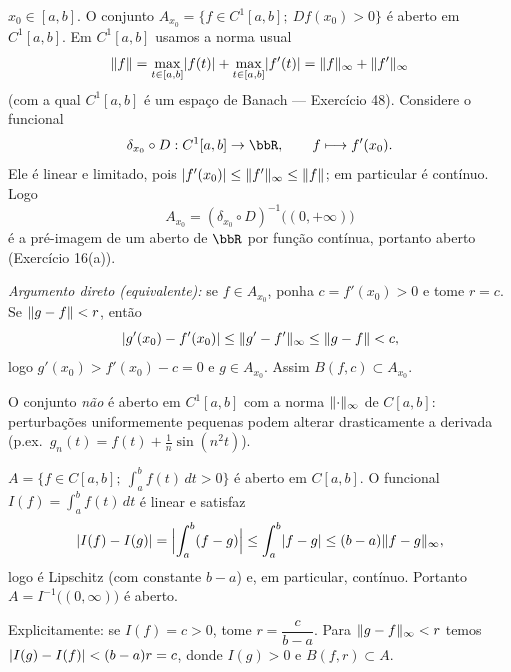 \begin{exercicio}{$x_0\in[a,b]$. O conjunto $A_{x_0}=\{f\in C^1[a,b];\ Df(x_0)>0\}$ é aberto em $C^1[a,b]$.}
\sol
Em $C^1[a,b]$ usamos a norma usual
\[ \lVert f\rVert=\max_{t\in[a,b]}\lvert f(t)\rvert+\max_{t\in[a,b]}\lvert f'(t)\rvert=\lVert f\rVert_\infty+\lVert f'\rVert_\infty \]
(com a qual $C^1[a,b]$ é um espaço de Banach --- Exercício 48). Considere o funcional
\[ \delta_{x_0}\circ D: C^1[a,b]\to\R, \qquad f\longmapsto f'(x_0). \]
Ele é linear e limitado, pois $\lvert f'(x_0)\rvert\le\lVert f'\rVert_\infty\le\lVert f\rVert$; em particular é contínuo. Logo
\[ A_{x_0}=(\delta_{x_0}\circ D)^{-1}\bigl((0,+\infty)\bigr) \]
é a pré-imagem de um aberto de $\R$ por função contínua, portanto aberto (Exercício 16(a)).

\emph{Argumento direto (equivalente):} se $f\in A_{x_0}$, ponha $c=f'(x_0)>0$ e tome $r=c$. Se $\lVert g-f\rVert<r$, então
\[ \lvert g'(x_0)-f'(x_0)\rvert\le\lVert g'-f'\rVert_\infty\le\lVert g-f\rVert<c, \]
logo $g'(x_0)>f'(x_0)-c=0$ e $g\in A_{x_0}$. Assim $B(f,c)\subset A_{x_0}$.

\begin{obs}
O conjunto \emph{não} é aberto em $C^1[a,b]$ com a norma $\lVert\cdot\rVert_\infty$ de $C[a,b]$: perturbações uniformemente pequenas podem alterar drasticamente a derivada (p.ex.\ $g_n(t)=f(t)+\frac1n\sin(n^2 t)$).
\end{obs}
\end{exercicio}

\begin{exercicio}{$A=\{f\in C[a,b];\ \int_a^b f(t)\,dt>0\}$ é aberto em $C[a,b]$.}
\sol
O funcional $I(f)=\int_a^b f(t)\,dt$ é linear e satisfaz
\[ \lvert I(f)-I(g)\rvert=\Bigl|\int_a^b (f-g)\Bigr|\le\int_a^b\lvert f-g\rvert\le (b-a)\lVert f-g\rVert_\infty, \]
logo é Lipschitz (com constante $b-a$) e, em particular, contínuo. Portanto $A=I^{-1}\bigl((0,\infty)\bigr)$ é aberto.

Explicitamente: se $I(f)=c>0$, tome $r=\dfrac{c}{b-a}$. Para $\lVert g-f\rVert_\infty<r$ temos $\lvert I(g)-I(f)\rvert<(b-a)r=c$, donde $I(g)>0$ e $B(f,r)\subset A$.
\end{exercicio}

